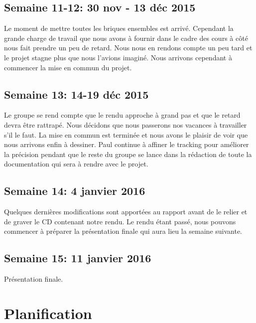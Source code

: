 \documentclass[11pt,a4paper,oldfontcommands]{memoir}
\begin{document}
\section{Semaine 11-12: 30 nov - 13 déc 2015}

Le moment de mettre toutes les briques ensembles est arrivé. Cependant la grande charge de travail que nous avons à fournir dans le cadre des cours à côté nous fait prendre un peu de retard. Nous nous en rendons compte un peu tard et le projet stagne plus que nous l'avions imaginé. Nous arrivons cependant à commencer la mise en commun du projet.

\section{Semaine 13: 14-19 déc 2015}

Le groupe se rend compte que le rendu approche à grand pas et que le retard devra être rattrapé. Nous décidons que nous passerons nos vacances à travailler s'il le faut. La mise en commun est terminée et nous avons le plaisir de voir que nous arrivons enfin à dessiner. Paul continue à affiner le tracking pour améliorer la précision pendant que le reste du groupe se lance dans la rédaction de toute la documentation qui sera à rendre avec le projet.

\section{Semaine 14: 4 janvier 2016}

Quelques dernières modifications sont apportées au rapport avant de le relier et de graver le CD contenant notre rendu. Le rendu étant passé, nous pouvons commencer à préparer la présentation finale qui aura lieu la semaine suivante.

\section{Semaine 15: 11 janvier 2016}

Présentation finale.


\chapter{Planification}
\end{document}
